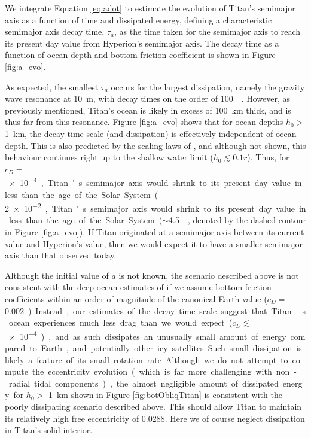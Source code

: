We integrate Equation \ref{eq:adot} to estimate the evolution of Titan's semimajor axis as a function of time and dissipated energy, defining a characteristic semimajor axis decay time, $\tau_{a}$, as the time taken for the semimajor axis to reach its present day value from Hyperion's semimajor axis. The decay time as a function of ocean depth and bottom friction coefficient is shown in Figure \ref{fig:a_evo}.
  
As expected, the smallest $\tau_a$ occurs for the largest dissipation, namely the gravity wave resonance at \SI{10}{\metre}, with decay times on the order of \SI{100}{\mega\year}. However, as previously mentioned, Titan's ocean is likely in excess of \SI{100}{\kilo\metre} thick, and is thus far from this resonance. Figure \ref{fig:a_evo} shows that for ocean depths $h_0 >$ \SI{1}{\kilo\metre}, the decay time-scale (and dissipation) is effectively independent of ocean depth. This is also predicted by the scaling laws of \citet{chen2013tidal}, and although not shown, this behaviour continues right up to the shallow water limit ($h_0 \lesssim 0.1r$). Thus, for $c_D =$ \SIrange{e-4}{2e-2}, Titan's semimajor axis would shrink to its present day value in less than the age of the Solar System ($\sim$\SI{4.5}{\giga\year}, denoted by the dashed contour in Figure \ref{fig:a_evo}). If Titan originated at a semimajor axis between its current value and Hyperion's value, then we would expect it to have a smaller semimajor axis than that observed today.

Although the initial value of $a$ is not known, the scenario described above is not consistent with the deep ocean estimates of \citep{sohl2003interior} if we assume bottom friction coefficients within an order of magnitude of the canonical Earth value ($c_D =$ \SI{0.002}). Instead, our estimates of the decay time scale suggest that Titan's ocean experiences much less drag than we would expect ($c_D \lesssim$ \SI{e-4}), and as such dissipates an unusually small amount of energy compared to Earth, and potentially other icy satellites. Such small dissipation is likely a feature of its small rotation rate.

Although we do not attempt to compute the eccentricity evolution (which is far more challenging with non-radial tidal components), the almost negligible amount of dissipated energy for $h_0 >$ \SI{1}{\kilo\metre} shown in Figure \ref{fig:botObliqTitan} is consistent with the poorly dissipating scenario described above. This should allow Titan to maintain its relatively high free eccentricity of 0.0288. Here we of course neglect dissipation in Titan's solid interior.